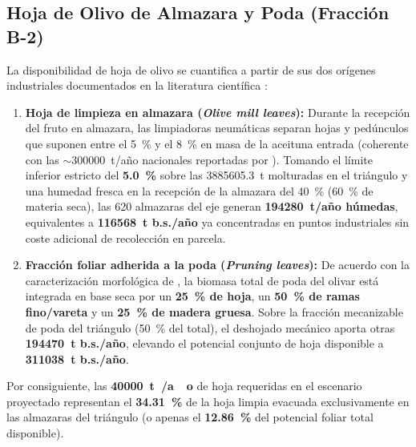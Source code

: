 \documentclass{report}
\begin{document}
\subsection{Hoja de Olivo de Almazara y Poda (Fracción B-2)}
La disponibilidad de hoja de olivo se cuantifica a partir de sus dos orígenes industriales documentados en la literatura científica \autocite{RomeroGarcia2014, Manzanares2017, MoranAlarcon2026}:
\begin{enumerate}
    \item \textbf{Hoja de limpieza en almazara (\textit{Olive mill leaves}):} Durante la recepción del fruto en almazara, las limpiadoras neumáticas separan hojas y pedúnculos que suponen entre el \SI{5}{\percent} y el \SI{8}{\percent} en masa de la aceituna entrada \autocite{RomeroGarcia2014, Manzanares2017} (coherente con las $\sim \num{300000}$~t/año nacionales reportadas por \textcite[Sección~3.1]{MoranAlarcon2026}). Tomando el límite inferior estricto del \textbf{\SI{5.0}{\percent}} sobre las \num{3885605.3}~t molturadas en el triángulo y una humedad fresca en la recepción de la almazara del \SI{40}{\percent} (\SI{60}{\percent} de materia seca), las \num{620} almazaras del eje generan \textbf{\num{194280}~t/año húmedas}, equivalentes a \textbf{\num{116568}~t b.s./año} ya concentradas en puntos industriales sin coste adicional de recolección en parcela.
    \item \textbf{Fracción foliar adherida a la poda (\textit{Pruning leaves}):} De acuerdo con la caracterización morfológica de \textcite{RomeroGarcia2014}, la biomasa total de poda del olivar está integrada en base seca por un \textbf{\SI{25}{\percent} de hoja}, un \textbf{\SI{50}{\percent} de ramas fino/vareta} y un \textbf{\SI{25}{\percent} de madera gruesa}. Sobre la fracción mecanizable de poda del triángulo (\SI{50}{\percent} del total), el deshojado mecánico aporta otras \textbf{\num{194470}~t b.s./año}, elevando el potencial conjunto de hoja disponible a \textbf{\num{311038}~t b.s./año}.
\end{enumerate}
Por consiguiente, las \textbf{\SI{40000}{\tonne{}/ao}} de hoja requeridas en el escenario proyectado representan el \textbf{\SI{34.31}{\percent}} de la hoja limpia evacuada exclusivamente en las almazaras del triángulo (o apenas el \textbf{\SI{12.86}{\percent}} del potencial foliar total disponible).
\end{document}
